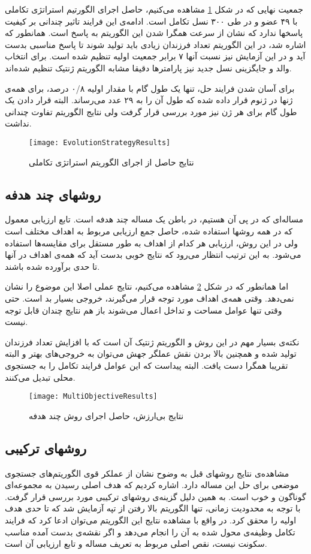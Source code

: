 \documentclass{report}
\begin{document}
جمعیت نهایی که در شکل \ref{fEvolutionStrategyResults} مشاهده می‌کنیم، حاصل اجرای الگورتیم استراتژی تکاملی با ۴۹ عضو و در طی ۳۰۰ نسل تکامل است. ادامه‌ی این فرایند تاثیر چندانی بر کیفیت پاسخها ندارد که نشان از سرعت همگرا شدن این الگوریتم به پاسخ است. همانطور که اشاره شد، در این الگوریتم تعداد فرزندان زیادی باید تولید شوند تا پاسخ مناسبی بدست آید و در این آزمایش نیز نسبت آنها ۷ برابر جمعیت اولیه تنظیم شده است. برای انتخاب والد و جایگزینی نسل جدید نیز پارامترها دقیقا مشابه الگوریتم ژنتیک تنظیم شده‌اند.

 برای آسان شدن فرایند حل، تنها یک طول گام با مقدار اولیه ۰/۸ درصد، برای همه‌ی ژنها در ژنوم قرار داده شده که طول آن را به ۲۹ عدد می‌رساند. البته قرار دادن یک طول گام برای هر ژن نیز مورد بررسی قرار گرفت ولی نتایج الگوریتم تفاوت چندانی نداشت. 

\begin{figure} \centerline{\texttt{[image: EvolutionStrategyResults]}} \caption{\label{fEvolutionStrategyResults}
نتایج حاصل از اجرای الگوریتم استراتژی تکاملی
} \end{figure}

\subsection{روشهای چند هدفه}
مساله‌ای که در پی آن هستیم، در باطن یک مساله چند هدفه است. تابع ارزیابی معمول که در همه روشها استفاده شده، حاصل جمع ارزیابی مربوط به اهداف مختلف است ولی در این روش، ارزیابی هر کدام از اهداف به طور مستقل برای مقایسه‌ها استفاده می‌شود. به این ترتیب انتظار می‌رود که نتایج خوبی بدست آید که همه‌ی اهداف در آنها تا حدی برآورده شده باشند.

اما همانطور که در شکل \ref{fMultiObjectiveResults} مشاهده می‌کنیم، نتایج عملی اصلا این موضوع را نشان نمی‌دهد. وقتی همه‌ی اهداف مورد توجه قرار می‌گیرند، خروجی بسیار بد است. حتی وقتی تنها عوامل مساحت و تداخل اعمال می‌شوند باز هم نتایج چندان قابل توجه نیست.

نکته‌ی بسیار مهم در این روش و الگوریتم ژنتیک آن است که با افزایش تعداد فرزندان تولید شده و همچنین بالا بردن نقش عملگر جهش می‌توان به خروجی‌های بهتر و البته تقریبا همگرا دست یافت. البته پیداست که این عوامل فرایند تکامل را به جستجوی محلی تبدیل می‌کنند.

\begin{figure} \centerline{\texttt{[image: MultiObjectiveResults]}} \caption{\label{fMultiObjectiveResults}
نتایج بی‌ارزش، حاصل اجرای روش چند هدفه
} \end{figure}

\subsection{روشهای ترکیبی}
مشاهده‌ی نتایج روشهای قبل به وضوح نشان از عملکر قوی الگوریتم‌های جستجوی موضعی برای حل این مساله دارد. اشاره کردیم که هدف اصلی رسیدن به مجموعه‌ای گوناگون و خوب است. به همین دلیل گزینه‌ی روشهای ترکیبی مورد بررسی قرار گرفت. با توجه به محدودیت زمانی، تنها الگوریتم بالا رفتن از تپه آزمایش شد که تا حدی هدف اولیه را محقق کرد. در واقع با مشاهده نتایج این الگوریتم می‌توان ادعا کرد که فرایند تکامل وظیفه‌ی محول شده به آن را انجام می‌دهد و اگر نقشه‌ی بدست آمده مناسب سکونت نیست، نقص اصلی مربوط به تعریف مساله و تابع ارزیابی آن است.
\end{document}
